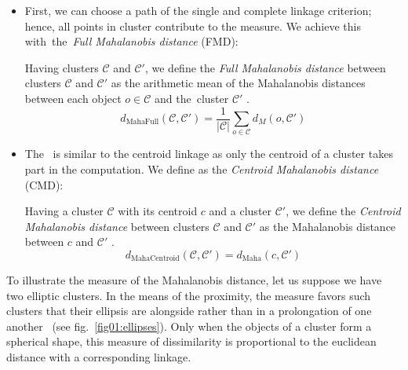 \begin{itemize}

\item
First, we can choose a path of the single and complete linkage criterion; hence, all points in cluster contribute to the measure. We achieve this with~the~\emph{Full Mahalanobis distance} (FMD):

\begin{defn}
	Having clusters $\mathcal{C}$ and $\mathcal{C}'$, we define the \emph{Full Mahalanobis distance} between clusters $\mathcal{C}$ and $\mathcal{C}'$ as the arithmetic mean of the Mahalanobis distances between each object $o \in \mathcal{C}$ and the~cluster $\mathcal{C}'$ .
	\begin{equation}\label{eq01:fmd}
	d_\text{MahaFull}(\mathcal{C},\mathcal{C}') =\frac{1}{|\mathcal{C}|}\sum_{o\in\mathcal{C}}{d_M(o,\mathcal{C}')}
	\end{equation}
	\label{def01:fmd}
\end{defn}

\item
The \ is similar to the centroid linkage as only the centroid of a cluster takes part in the computation. We define  as the \emph{Centroid Mahalanobis distance} (CMD):

\begin{defn}
	Having a cluster $\mathcal{C}$ with its centroid $c$ and a cluster $\mathcal{C}'$, we define the \emph{Centroid Mahalanobis distance} between clusters $\mathcal{C}$ and $\mathcal{C}'$ as the Mahalanobis distance between $c$ and $\mathcal{C}'$ .
	\begin{equation}\label{eq01:cmd}
	d_\text{MahaCentroid}(\mathcal{C},\mathcal{C}')=d_\text{Maha}(c,\mathcal{C}')
	\end{equation}
	\label{def01:cmd}
\end{defn}

\end{itemize}

To illustrate the measure of the Mahalanobis distance, let us suppose we have two elliptic clusters. In the means of the proximity, the measure favors such clusters that their ellipsis are alongside rather than in a prolongation of one another~\cite{dagnelie1991using} (see fig.~\ref{fig01:ellipses}). Only when the objects of a cluster form a spherical shape, this measure of dissimilarity is proportional to the euclidean distance with a corresponding linkage.


